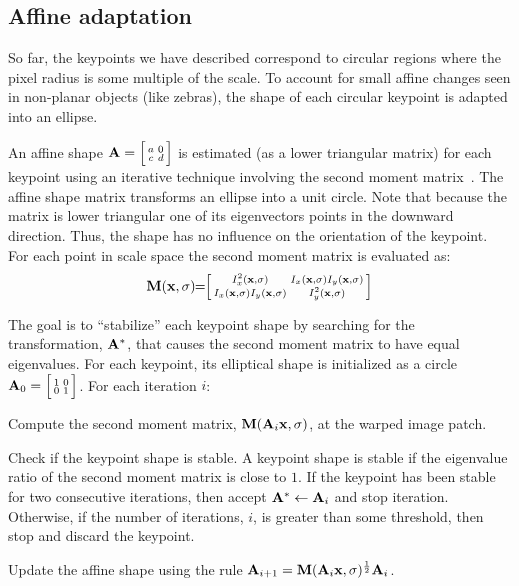     \subsection{Affine adaptation}
        So far, the keypoints we have described correspond to circular regions where the pixel radius is some
        multiple of the scale. To account for small affine changes seen in non-planar objects (like zebras), the
        shape of each circular keypoint is adapted into an ellipse.

        An affine shape $\mathbf{A}= \Bigl[ \begin{smallmatrix} a & 0\\c & d \end{smallmatrix} \Bigr] $ is estimated (as a lower triangular matrix) for each keypoint using an
        iterative technique involving the second moment
        matrix~\cite{lindeberg_shape_adapted_1997,baumberg_reliable_2000,mikolajczyk_comparison_2005}. The affine
        shape matrix transforms an ellipse into a unit circle. Note that because the matrix is lower triangular one
        of its eigenvectors points in the downward direction. Thus, the shape has no influence on the orientation
        of the keypoint. For each point in scale space the second moment matrix is evaluated as:
        \begin{equation}\label{eqn:secondmoment}
                \mathbf{M}(\mathbf{x}, \sigma) 
                \mkern-6mu=\mkern-6mu 
                 \Bigl[ \begin{smallmatrix}  
                I_x^2(\mathbf{x}, \sigma)      & I_x(\mathbf{x}, \sigma) I_y(\mathbf{x}, \sigma) \\
                I_x(\mathbf{x}, \sigma) I_y(\mathbf{x}, \sigma) & I_y^2(\mathbf{x}, \sigma)  \end{smallmatrix} \Bigr] 
        \end{equation}

        The goal is to ``stabilize'' each keypoint shape by searching for the transformation, $\mathbf{A}^*$, that
        causes the second moment matrix to have equal eigenvalues. For each keypoint, its elliptical shape is
        initialized as a circle $\mathbf{A}_0= \Bigl[ \begin{smallmatrix} 1 & 0\\0 & 1 \end{smallmatrix} \Bigr] $. For each iteration $i$:

        \begin{enumln}

            \item Compute the second moment matrix, $\mathbf{M}(\mathbf{A}_i\mathbf{x}, \sigma)$, at the warped image patch.

            \item Check if the keypoint shape is stable. A keypoint shape is stable if the eigenvalue ratio of the
            second moment matrix is close to $1$. If the keypoint has been stable for two consecutive iterations,
            then accept $\mathbf{A}^* \leftarrow \mathbf{A}_{i}$ and stop iteration. Otherwise, if the number of iterations,
            $i$, is greater than some threshold, then stop and discard the keypoint.

            \item Update the affine shape  using the rule
                $\mathbf{A}_{i + 1} = \mathbf{M}(\mathbf{A}_i\mathbf{x}, \sigma)^{\frac{1}{2}} \mathbf{A}_i$.
        \end{enumln}


